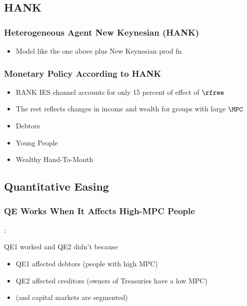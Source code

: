 \documentclass{beamer}
\begin{document}
\subsection{HANK}


\begin{frame}
\frametitle{Heterogeneous Agent New Keynesian (HANK)} 

\begin{itemize}
\item Model like the one above plus New Keynesian prod fn
\end{itemize}
\end{frame}


\begin{frame}\frametitle{Monetary Policy According to HANK}

\cite{kmvHANK}

\medskip\medskip

\begin{itemize}
\item RANK IES channel accounts for only 15 percent of effect of $\rfree$
\item The rest reflects changes in income and wealth for groups with large $\MPC$
\bi
\item Debtors
\item Young People
\item Wealthy Hand-To-Mouth
\ei
\end{itemize}

\end{frame}

\subsection{Quantitative Easing}

\begin{frame}\frametitle{QE Works When It Affects High-MPC People}

\cite{dkpQE}:

QE1 worked and QE2 didn't because
\begin{itemize}
\item QE1 affected debtors (people with high MPC)
\item QE2 affected creditors (owners of Treasuries have a low MPC)
\item (and capital markets are segmented)
\end{itemize}


\end{frame}
\end{document}
